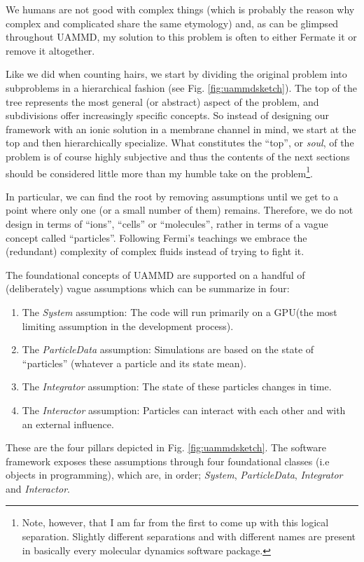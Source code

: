 \documentclass[twoside,openright,titlepage,numbers=noenddot,%
headinclude,footinclude,cleardoublepage=empty,abstract=on,
BCOR=5mm,fontsize=11pt, dvipsnames, paper=b5
]{scrreprt}
\newcommand{\uammd}{\gls{UAMMD}\xspace}
\newcommand{\gpu}{\gls{GPU}\xspace}
\begin{document}
We humans are not good with complex things (which is probably the reason why complex and complicated share the same etymology) and, as can be glimpsed throughout \uammd, my solution to this problem is often to either Fermate it or remove it altogether.

Like we did when counting hairs, we start by dividing the original problem into subproblems in a hierarchical fashion (see Fig. \ref{fig:uammdsketch}). The top of the tree represents the most general (or abstract) aspect of the problem, and subdivisions offer increasingly specific concepts. So instead of designing our framework with an ionic solution in a membrane channel in mind, we start at the top and then hierarchically specialize. What constitutes the ``top'', or \emph{soul}, of the problem is of course highly subjective and thus the contents of the next sections should be considered little more than my humble take on the problem\footnote{Note, however, that I am far from the first to come up with this logical separation. Slightly different separations and with different names are present in basically every molecular dynamics software package.}.

In particular, we can find the root by removing assumptions until we get to a point where only one (or a small number of them) remains. Therefore, we do not design in terms of ``ions'', ``cells'' or ``molecules'', rather in terms of a vague concept called ``particles''.
Following Fermi's teachings we embrace the (redundant) complexity of complex fluids instead of trying to fight it.


The foundational concepts of \uammd are supported on a handful of (deliberately) vague assumptions which can be summarize in four:
\begin{enumerate}[label=\textbf{S.\arabic*}]
\item The \emph{System} assumption: The code will run primarily on a \gpu (the most limiting assumption in the development process).
\item The \emph{ParticleData} assumption: Simulations are based on the state of ``particles'' (whatever a particle and its state mean).
\item The \emph{Integrator} assumption: The state of these particles changes in time.
\item The \emph{Interactor} assumption: Particles can interact with each other and with an external influence.
\end{enumerate}
These are the four pillars depicted in Fig. \ref{fig:uammdsketch}. The software framework exposes these assumptions through four foundational classes (i.e objects in programming), which are, in order; \emph{System}, \emph{ParticleData}, \emph{Integrator} and \emph{Interactor}.
\end{document}
